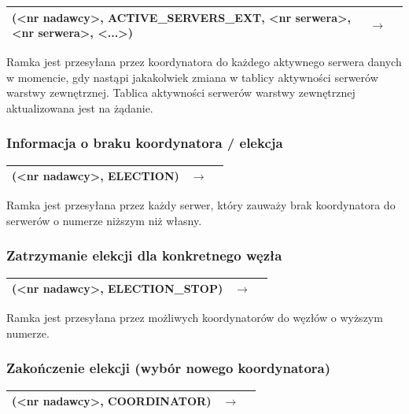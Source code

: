 \begin{longtable}{| p{} | p{}| p{} |} 
\hline
(<nr nadawcy>, ACTIVE\_SERVERS\_EXT, <nr serwera>, <nr serwera>, <...>)& $\rightarrow$ &  \\ \hline
\end{longtable}

Ramka jest przesyłana przez koordynatora do każdego aktywnego serwera danych w momencie, gdy nastąpi jakakolwiek zmiana w tablicy aktywności serwerów warstwy zewnętrznej. Tablica aktywności serwerów warstwy zewnętrznej aktualizowana jest na żądanie.

\subsubsection{Informacja o braku koordynatora / elekcja}

\begin{longtable}{| p{} | p{}| p{} |} 
\hline
(<nr nadawcy>, ELECTION) & $\rightarrow$ &  \\ \hline
\end{longtable}

Ramka jest przesyłana przez każdy serwer, który zauważy brak koordynatora do serwerów o numerze niższym niż własny.

\subsubsection{Zatrzymanie elekcji dla konkretnego węzła}

\begin{longtable}{| p{} | p{}| p{} |} 
\hline
(<nr nadawcy>, ELECTION\_STOP) & $\rightarrow$ &  \\ \hline
\end{longtable}

Ramka jest przesyłana przez możliwych koordynatorów do węzłów o wyższym numerze.

\subsubsection{Zakończenie elekcji (wybór nowego koordynatora)}

\begin{longtable}{| p{} | p{}| p{} |} 
\hline
(<nr nadawcy>, COORDINATOR) & $\rightarrow$ &  \\ \hline
\end{longtable}

